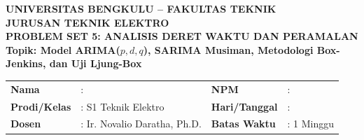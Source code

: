 \documentclass[11pt,a4paper]{article}
\begin{document}
\begin{center}
    {\large \textbf{\color{primaryblue}UNIVERSITAS BENGKULU -- FAKULTAS TEKNIK}}\\[0.1cm]
    {\large \textbf{\color{secondaryblue}JURUSAN TEKNIK ELEKTRO}}\\[0.2cm]
    {\LARGE \textbf{\color{primaryblue}PROBLEM SET 5: ANALISIS DERET WAKTU DAN PERAMALAN}}\\[0.1cm]
    {\normalsize \textbf{Topik: Model ARIMA($p,d,q$), SARIMA Musiman, Metodologi Box-Jenkins, dan Uji Ljung-Box}}
\end{center}

\vspace{0.1cm}

\begin{tcolorbox}[colback=boxbg,colframe=primaryblue,arc=2mm,title=\textbf{Informasi Tugas \& Identitas Mahasiswa}]
\small
\begin{tabular}{p{2.2cm}p{5.5cm}p{2.2cm}p{5.0cm}}
\textbf{Nama} & : \dotfill & \textbf{NPM} & : \dotfill \\
\textbf{Prodi/Kelas} & : S1 Teknik Elektro & \textbf{Hari/Tanggal} & : \dotfill \\
\textbf{Dosen} & : Ir. Novalio Daratha, Ph.D. & \textbf{Batas Waktu} & : 1 Minggu \\
\end{tabular}
\end{tcolorbox}

\vspace{0.2cm}
\end{document}
